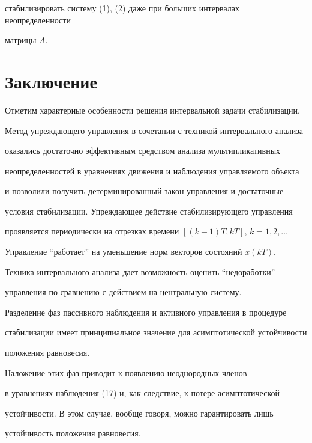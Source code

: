 стабилизировать систему (1), (2) даже при больших интервалах неопределенности


матрицы $A$.





\section*{Заключение}





Отметим характерные особенности решения интервальной задачи стабилизации.





Метод упреждающего управления в сочетании с техникой интервального анализа


оказались достаточно эффективным средством анализа мультипликативных


неопределенностей в уравнениях движения и наблюдения управляемого объекта


и позволили получить детерминированный закон управления и достаточные


условия стабилизации. Упреждающее действие стабилизирующего управления


проявляется периодически на отрезках времени $[(k-1)T,kT]$, $k=1,2,\dotsc$


Управление ``работает'' на уменьшение норм векторов состояний $x(kT)$.


Техника интервального анализа дает возможность оценить ``недоработки''


управления по сравнению с действием на центральную систему.





Разделение фаз пассивного наблюдения и активного управления в процедуре


стабилизации имеет принципиальное значение для асимптотической устойчивости


положения равновесия. 


Наложение этих фаз приводит к появлению неоднородных членов


в уравнениях наблюдения (17) и, как следствие, к потере асимптотической


устойчивости. В этом случае, вообще говоря, можно гарантировать лишь


устойчивость положения равновесия.





